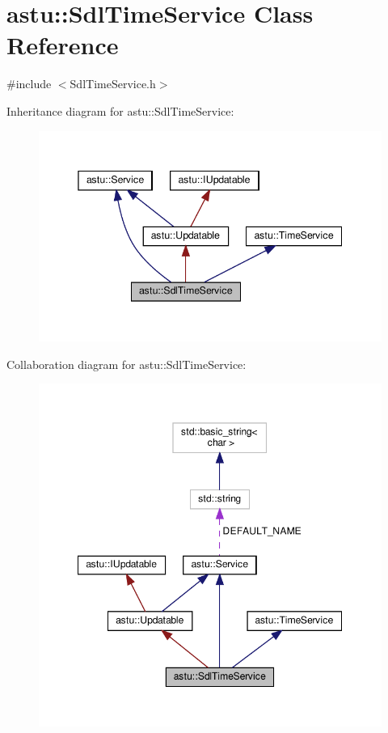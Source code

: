 \hypertarget{classastu_1_1SdlTimeService}{}\section{astu\+:\+:Sdl\+Time\+Service Class Reference}
\label{classastu_1_1SdlTimeService}


{\ttfamily \#include $<$Sdl\+Time\+Service.\+h$>$}



Inheritance diagram for astu\+:\+:Sdl\+Time\+Service\+:\nopagebreak
\begin{figure}[H]
\begin{center}
\leavevmode
\includegraphics[width=345pt]{classastu_1_1SdlTimeService__inherit__graph}
\end{center}
\end{figure}


Collaboration diagram for astu\+:\+:Sdl\+Time\+Service\+:\nopagebreak
\begin{figure}[H]
\begin{center}
\leavevmode
\includegraphics[width=349pt]{classastu_1_1SdlTimeService__coll__graph}
\end{center}
\end{figure}
